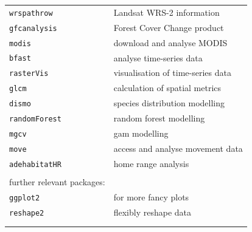\documentclass[10pt,landscape]{article}
\begin{document}
\begin{multicols}{3}
\begin{tabular}{@{}ll@{}}
\verb!wrspathrow!  & Landsat WRS-2 information\\
\verb!gfcanalysis!  & Forest Cover Change product\\

\verb!modis!  & download and analyse MODIS\\
\verb!bfast!  & analyse time-series data\\
\verb!rasterVis!  & visualisation of time-series data\\
\verb!glcm!  & calculation of spatial metrics\\

\verb!dismo!  &  species distribution modelling \\
\verb!randomForest!  &  random forest modelling \\
\verb!mgcv!  &  gam modelling \\
\verb!move!  & access and analyse movement data\\
\verb!adehabitatHR!  & home range analysis\\

& \\
further relevant packages:\\

\verb!ggplot2!  & for more fancy plots\\
\verb!reshape2!  & flexibly reshape data \\
 & \\
 &
\end{tabular}



\end{multicols}
\end{document}
